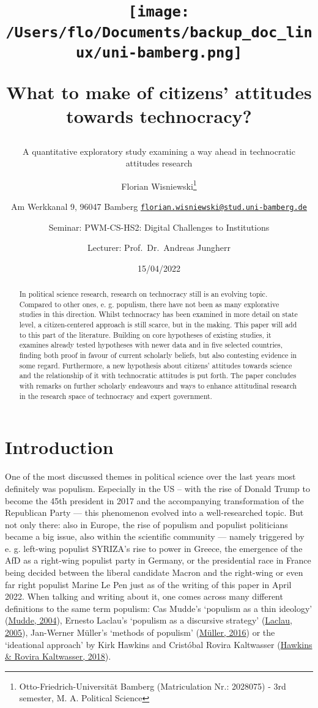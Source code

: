 \documentclass[
  12pt,
  english,
]{article}
\title{\texttt{[image: /Users/flo/Documents/backup\_doc\_linux/uni-bamberg.png]}

What to make of citizens' attitudes towards technocracy?}
\subtitle{A quantitative exploratory study examining a way ahead in
technocratic attitudes research}
\author{Florian Wisniewski\footnote{Otto-Friedrich-Universität Bamberg
  (Matriculation Nr.: 2028075) - 3rd semester, M. A. Political Science} \and Am
Werkkanal 9, 96047 Bamberg \textbar{}
\href{mailto:florian.wisniewski@stud.uni-bamberg.de}{\nolinkurl{florian.wisniewski@stud.uni-bamberg.de}} \and Seminar:
PWM-CS-HS2: Digital Challenges to Institutions \and Lecturer:
Prof.~Dr.~Andreas Jungherr}
\date{15/04/2022}
\begin{document}
\maketitle
\begin{abstract}
In political science research, research on technocracy still is an
evolving topic. Compared to other ones, e. g. populism, there have not
been as many explorative studies in this direction. Whilst technocracy
has been examined in more detail on state level, a citizen-centered
approach is still scarce, but in the making. This paper will add to this
part of the literature. Building on core hypotheses of existing studies,
it examines already tested hypotheses with newer data and in five
selected countries, finding both proof in favour of current scholarly
beliefs, but also contesting evidence in some regard. Furthermore, a new
hypothesis about citizens' attitudes towards science and the
relationship of it with technocratic attitudes is put forth. The paper
concludes with remarks on further scholarly endeavours and ways to
enhance attitudinal research in the research space of technocracy and
expert government.
\end{abstract}

\newpage{}

\tableofcontents

\newpage{}

\hypertarget{introduction}{%
\section{Introduction}\label{introduction}}

One of the most discussed themes in political science over the last
years most definitely was populism. Especially in the US -- with the
rise of Donald Trump to become the 45th president in 2017 and the
accompanying transformation of the Republican Party --- this phenomenon
evolved into a well-researched topic. But not only there: also in
Europe, the rise of populism and populist politicians became a big
issue, also within the scientific community --- namely triggered by e.
g. left-wing populist SYRIZA's rise to power in Greece, the emergence of
the AfD as a right-wing populist party in Germany, or the presidential
race in France being decided between the liberal candidate Macron and
the right-wing or even far right populist Marine Le Pen just as of the
writing of this paper in April 2022. When talking and writing about it,
one comes across many different definitions to the same term populism:
Cas Mudde's `populism as a thin ideology'
(\protect\hyperlink{ref-mudde2004populist}{Mudde, 2004}), Ernesto
Laclau's `populism as a discursive strategy'
(\protect\hyperlink{ref-laclau2005populist}{Laclau, 2005}), Jan-Werner
Müller's `methods of populism'
(\protect\hyperlink{ref-muxfcller2016populismus}{Müller, 2016}) or the
`ideational approach' by Kirk Hawkins and Cristóbal Rovira Kaltwasser
(\protect\hyperlink{ref-hawkins2018ideational}{Hawkins \& Rovira
Kaltwasser, 2018}).
\end{document}
